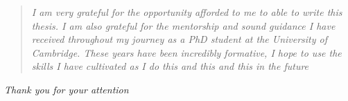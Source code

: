 \pagebreak
\hspace{0pt}
\vspace*{\fill}
\begin{quote}\emph{
I am very grateful for the opportunity afforded to me to able to write this thesis.
I am also grateful for the mentorship and sound guidance I have received throughout my journey as a PhD student at the University of Cambridge.
These years have been incredibly formative,
I hope to use the skills I have cultivated as I do this and this and this in the future
}
\end{quote}
\mbox{}\hfill \emph{Thank you for your attention}
\vspace*{\fill}
\hspace{0pt}
\nocite{bairdFrontalLobeActivation2002}
\nocite{simmonsKissMakeUp2002}

